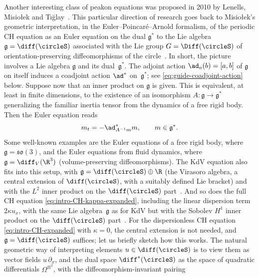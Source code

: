 \documentclass[10pt,a4paper]{article} \pdfoutput=1 
\begin{document}
Another interesting class of peakon equations was proposed in 2010 by Lenells, Misiołek and
Tığlay~\cite{lenells-misiolek-tiglay:2010:evolution-equations-tensor-densities-peakons}.
This particular direction of research goes back to
Misiołek's geometric interpretation, in the Euler--Poincaré--Arnold formalism,
of the periodic CH equation as an Euler equation on the dual $\mathfrak{g}^*$
to the Lie algebra
$\mathfrak{g} = \diff(\circleS)$
associated with the Lie group
$G = \Diff(\circleS)$
of orientation-preserving diffeomorphisms of the circle~\cite{misiolek:1998:CH-as-geodesic-flow-on-Bott-Virasoro-group}.
In short, the picture involves a Lie algebra $\mathfrak{g}$ and its dual~$\mathfrak{g^*}$.
The adjoint action $\ad_a(b) = [a,b]$ of $\mathfrak{g}$ on itself
induces a coadjoint action $\ad^*$ on~$\mathfrak{g}^*$;
see \eqref{eq:guide-coadjoint-action} below.
Suppose now that an inner product on $\mathfrak{g}$ is given.
This is equivalent, at least in finite dimensions, to the existence of
an isomorphism  $A \colon \mathfrak{g} \to \mathfrak{g}^*$
generalizing the familiar inertia tensor from the dynamics of a free rigid body.
Then the Euler equation reads
\begin{equation*}
  m_t=-\ad^*_{A^{-1} m} m
  , \qquad
  m \in \mathfrak{g}^*
  .
\end{equation*}
Some well-known examples are the Euler equations of a free rigid body,
where $\mathfrak{g}=\mathfrak{so}(3)$,
and the Euler equations from fluid dynamics, where $\mathfrak{g} = \diff_V(\R^3)$
(volume-preserving diffeomorphisms).
The KdV equation also fits into this setup, with $\mathfrak{g} = \diff(\circleS) \oplus \R$
(the Virasoro algebra, a central extension of $\diff(\circleS)$, with a suitably defined Lie bracket)
and with the $L^2$ inner product on the $\diff(\circleS)$ part~\cite{ovsienko-khesin:1987:KdV-to-Euler}.
And so does the full CH equation \eqref{eq:intro-CH-kappa-expanded},
including the linear dispersion term $2 \kappa u_x$,
with the same Lie algebra~$\mathfrak{g}$ as for KdV but with the
Sobolev $H^1$ inner product on the $\diff(\circleS)$ part~\cite{misiolek:1998:CH-as-geodesic-flow-on-Bott-Virasoro-group}.
For the dispersionless CH equation \eqref{eq:intro-CH-expanded} with $\kappa=0$,
the central extension is not needed, and $\mathfrak{g} = \diff(\circleS)$ suffices;
let us briefly sketch how this works.
The natural geometric way of interpreting elements $u \in \diff(\circleS)$ is to view them as vector fields
$u \, \partial_x$, and the dual space $\diff^* (\circleS)$ as the space of quadratic
differentials $\Omega^{\otimes^2}$, with the diffeomorphism-invariant pairing
\end{document}
